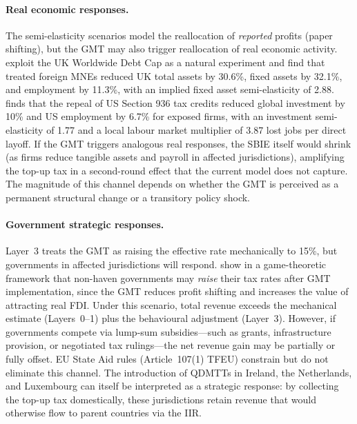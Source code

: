 \documentclass[11pt,a4paper]{article}
\begin{document}
\paragraph{Real economic responses.} The semi-elasticity scenarios model the reallocation of \emph{reported} profits (paper shifting), but the GMT may also trigger reallocation of real economic activity. \citet{bilicka2022} exploit the UK Worldwide Debt Cap as a natural experiment and find that treated foreign MNEs reduced UK total assets by 30.6\%, fixed assets by 32.1\%, and employment by 11.3\%, with an implied fixed asset semi-elasticity of 2.88. \citet{suarezserrato2019} finds that the repeal of US Section 936 tax credits reduced global investment by 10\% and US employment by 6.7\% for exposed firms, with an investment semi-elasticity of 1.77 and a local labour market multiplier of 3.87 lost jobs per direct layoff. If the GMT triggers analogous real responses, the SBIE itself would shrink (as firms reduce tangible assets and payroll in affected jurisdictions), amplifying the top-up tax in a second-round effect that the current model does not capture. The magnitude of this channel depends on whether the GMT is perceived as a permanent structural change or a transitory policy shock.

\paragraph{Government strategic responses.} Layer~3 treats the GMT as raising the effective rate mechanically to 15\%, but governments in affected jurisdictions will respond. \citet{janeba2023} show in a game-theoretic framework that non-haven governments may \emph{raise} their tax rates after GMT implementation, since the GMT reduces profit shifting and increases the value of attracting real FDI. Under this scenario, total revenue exceeds the mechanical estimate (Layers~0--1) plus the behavioural adjustment (Layer~3). However, if governments compete via lump-sum subsidies---such as grants, infrastructure provision, or negotiated tax rulings---the net revenue gain may be partially or fully offset. EU State Aid rules (Article~107(1) TFEU) constrain but do not eliminate this channel. The introduction of QDMTTs in Ireland, the Netherlands, and Luxembourg can itself be interpreted as a strategic response: by collecting the top-up tax domestically, these jurisdictions retain revenue that would otherwise flow to parent countries via the IIR.
\end{document}
